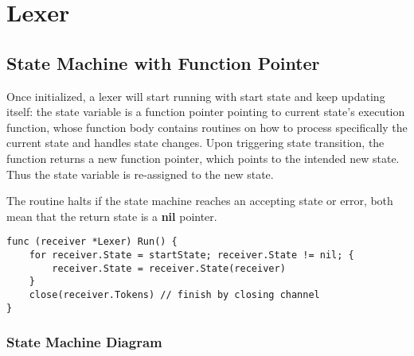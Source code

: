 \documentclass[%
 aip,
 jmp,%
 amsmath,amssymb,
 reprint,%
]{revtex4-1}
\begin{document}
\section{Lexer}


\subsection{State Machine with Function Pointer}

Once initialized, a lexer will start running with start state and keep updating
itself: the state variable is a function pointer pointing to current state's execution function, whose function body contains routines on how to process specifically the current state and handles state changes. Upon triggering state transition, the function returns a new function pointer, which points to the intended new state. Thus the state variable is re-assigned to the new state.

The routine halts if the state machine reaches an accepting state or error, both mean that the return state is a \textbf{nil} pointer. 

\newpage

\begin{widetext}
\centering
\begin{lstlisting}[label=state-transition,caption=State Machine Transition]
func (receiver *Lexer) Run() {
	for receiver.State = startState; receiver.State != nil; {
		receiver.State = receiver.State(receiver)
	}
	close(receiver.Tokens) // finish by closing channel
}
\end{lstlisting}
\end{widetext}

\subsubsection{State Machine Diagram}%

\begin{widetext}
\centering
{}
\end{widetext}
\end{document}
